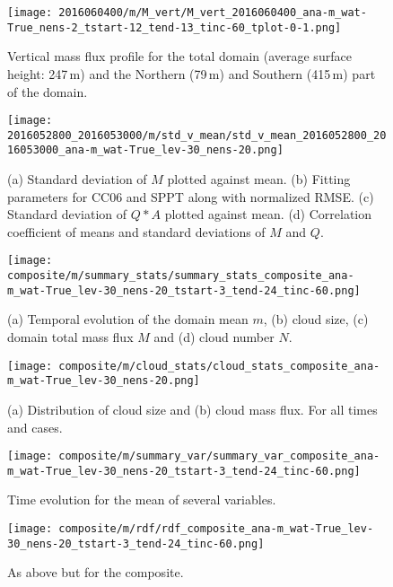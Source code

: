 \documentclass[a4paper, 12pt]{article}
\begin{document}
\begin{figure}[ht]
\noindent \centering
\texttt{[image: 2016060400/m/M\_vert/M\_vert\_2016060400\_ana-m\_wat-True\_nens-2\_tstart-12\_tend-13\_tinc-60\_tplot-0-1.png]}\\
\caption{Vertical mass flux profile for the total domain (average surface height: 247\,m) and the Northern (79\,m) and Southern (415\,m) part of the domain.} \label{fig:Fig5}
\end{figure}

\begin{figure}[ht]
\noindent \centering
\texttt{[image: 2016052800\_2016053000/m/std\_v\_mean/std\_v\_mean\_2016052800\_2016053000\_ana-m\_wat-True\_lev-30\_nens-20.png]}\\
\caption{(a) Standard deviation of $M$ plotted against mean. (b) Fitting parameters for CC06 and SPPT along with normalized RMSE. (c) Standard deviation of $Q*A$ plotted against mean. (d) Correlation coefficient of means and standard deviations of $M$ and $Q$.} \label{fig:Fig6}
\end{figure}

\begin{figure}[ht]
\noindent \centering
\texttt{[image: composite/m/summary\_stats/summary\_stats\_composite\_ana-m\_wat-True\_lev-30\_nens-20\_tstart-3\_tend-24\_tinc-60.png]}\\
\caption{(a) Temporal evolution of the domain mean $m$, (b) cloud size, (c) domain total mass flux $M$ and (d) cloud number $N$.} \label{fig:Fig7}
\end{figure}

\begin{figure}[ht]
\noindent \centering
\texttt{[image: composite/m/cloud\_stats/cloud\_stats\_composite\_ana-m\_wat-True\_lev-30\_nens-20.png]}\\
\caption{(a) Distribution of cloud size and (b) cloud mass flux. For all times and cases.} \label{fig:Fig8}
\end{figure}

\begin{figure}[ht]
\noindent \centering
\texttt{[image: composite/m/summary\_var/summary\_var\_composite\_ana-m\_wat-True\_lev-30\_nens-20\_tstart-3\_tend-24\_tinc-60.png]}\\
\caption{Time evolution for the mean of several variables.} \label{fig:Fig9}
\end{figure}

\begin{figure}[ht]
\noindent \centering
\texttt{[image: composite/m/rdf/rdf\_composite\_ana-m\_wat-True\_lev-30\_nens-20\_tstart-3\_tend-24\_tinc-60.png]}\\
\caption{As above but for the composite.} \label{fig:Fig10}
\end{figure}
\end{document}
